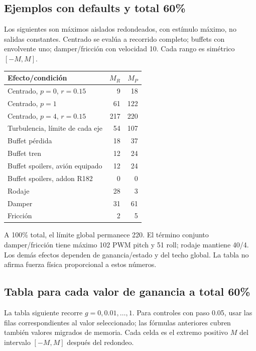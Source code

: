 \documentclass[11pt,a4paper]{article}
\begin{document}
\subsection{Ejemplos con defaults y total 60\%}
Los siguientes son máximos aislados redondeados, con estímulo máximo, no salidas constantes. Centrado se evalúa a recorrido completo; buffets con envolvente uno; damper/fricción con velocidad 10. Cada rango es simétrico $[-M,M]$.
\begin{center}\begin{tabular}{lrr}\toprule Efecto/condición & $M_R$ & $M_P$\\\midrule
Centrado, $p=0$, $r=0.15$ & 9 & 18\\
Centrado, $p=1$ & 61 & 122\\
Centrado, $p=4$, $r=0.15$ & 217 & 220\\
Turbulencia, límite de cada eje & 54 & 107\\
Buffet pérdida & 18 & 37\\
Buffet tren & 12 & 24\\
Buffet spoilers, avión equipado & 12 & 24\\
Buffet spoilers, addon R182 & 0 & 0\\
Rodaje & 28 & 3\\
Damper & 31 & 61\\
Fricción & 2 & 5\\\bottomrule\end{tabular}\end{center}
A 100\% total, el límite global permanece 220. El término conjunto damper/fricción tiene máximo 102 PWM pitch y 51 roll; rodaje mantiene 40/4. Los demás efectos dependen de ganancia/estado y del techo global. La tabla no afirma fuerza física proporcional a estos números.

\subsection{Tabla para cada valor de ganancia a total 60\%}
La tabla siguiente recorre $g=0,0.01,\ldots,1$. Para controles con paso 0.05, usar las filas correspondientes al valor seleccionado; las fórmulas anteriores cubren también valores migrados de memoria. Cada celda es el extremo positivo $M$ del intervalo $[-M,M]$ después del redondeo.
\end{document}
